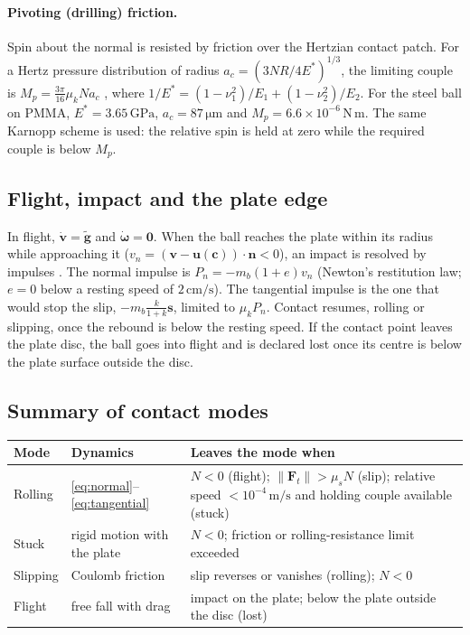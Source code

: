 \documentclass[10pt,a4paper]{article}
\newcommand{\un}[1]{\,\mathrm{#1}}
\newcommand{\vect}[1]{\bm{#1}}
\newcommand{\hatn}{\vect{n}}
\begin{document}
\paragraph{Pivoting (drilling) friction.} Spin about the normal is resisted by friction over
the Hertzian contact patch. For a Hertz pressure distribution of radius
$a_c=\left(3NR/4E^*\right)^{1/3}$, the limiting couple is $M_p=\frac{3\pi}{16}\mu_kNa_c$
\citep{johnson1985contact}, where
$1/E^*=(1-\nu_1^2)/E_1+(1-\nu_2^2)/E_2$. For the steel ball on PMMA, $E^*=3.65\un{GPa}$,
$a_c=87\un{\mu m}$ and $M_p=6.6\times10^{-6}\un{N\,m}$. The same Karnopp scheme is used: the
relative spin is held at zero while the required couple is below $M_p$.

\subsection{Flight, impact and the plate edge}
In flight, $\dot{\vect v}=\tilde{\vect g}$ and $\dot{\vect\omega}=\vect 0$. When the ball reaches
the plate within its radius while approaching it ($v_n=(\vect v-\vect u(\vect c))\cdot\hatn<0$),
an impact is resolved by impulses \citep{stronge2000impact}. The normal impulse is
$P_n=-m_b(1+e)v_n$ (Newton's restitution law; $e=0$ below a resting speed of $2\un{cm/s}$). The
tangential impulse is the one that would stop the slip, $-m_b\frac{k}{1+k}\vect s$, limited to
$\mu_kP_n$. Contact resumes, rolling or slipping, once the rebound is below the resting speed.
If the contact point leaves the plate disc, the ball goes into flight and is declared lost once
its centre is below the plate surface outside the disc.

\subsection{Summary of contact modes}
\begin{center}
\begin{tabularx}{\textwidth}{lXX}
\toprule
Mode & Dynamics & Leaves the mode when\\
\midrule
Rolling & \eqref{eq:normal}--\eqref{eq:tangential} & $N<0$ (flight); $\lVert\vect F_t\rVert>\mu_sN$ (slip); relative speed $<10^{-4}\un{m/s}$ and holding couple available (stuck)\\
Stuck & rigid motion with the plate & $N<0$; friction or rolling-resistance limit exceeded\\
Slipping & Coulomb friction & slip reverses or vanishes (rolling); $N<0$\\
Flight & free fall with drag & impact on the plate; below the plate outside the disc (lost)\\
\bottomrule
\end{tabularx}
\end{center}
\end{document}
